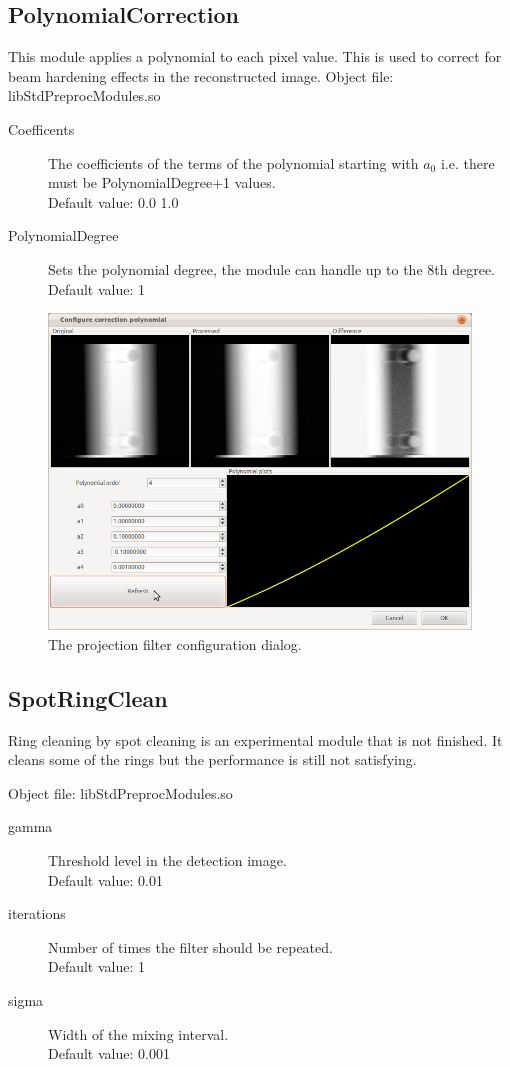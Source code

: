 \documentclass[a4paper]{scrreprt}
\begin{document}
\subsection{PolynomialCorrection}
This module applies a polynomial to each pixel value. This is used to correct for beam hardening effects in the reconstructed image.
Object file: libStdPreprocModules.so
\begin{description}
 \item[Coefficents] The coefficients of the terms of the polynomial starting with $a_0$ i.e. there must be PolynomialDegree+1 values.\\ Default value: 0.0 1.0
 \item[PolynomialDegree] Sets the polynomial degree, the module can handle up to the 8th degree. \\Default value: 1
\end{description}
\begin{figure}[ht!]
\centering
\includegraphics[scale=0.5]{figures/ConfPolyCorr.png}
\caption{The projection filter configuration dialog.}
\end{figure}


\subsection{SpotRingClean}
Ring cleaning by spot cleaning is an experimental module that is not finished. It cleans some of the rings but the performance is still not satisfying.

Object file: libStdPreprocModules.so
\begin{description}
 \item[gamma] Threshold level in the detection image. \\Default value: 0.01
 \item[iterations] Number of times the filter should be repeated. \\Default value: 1
 \item[sigma] Width of the mixing interval. \\ Default value: 0.001
\end{description}
\end{document}
